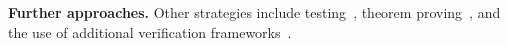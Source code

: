 \medskip
\noindent
\textbf{Further approaches.}
Other strategies include testing~\cite{WiGo93,PrGr12,PrGr13,EmEn17,Lo17}, theorem proving~\cite{CoDoGr05,DeScWe11}, and the use of additional verification frameworks~\cite{BoEmEnMu17,FeEnMoRiSh18,EnKo24}.





